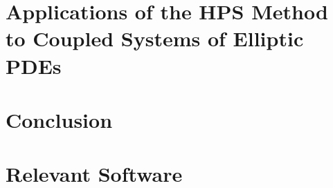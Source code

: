 \documentclass[12pt,twoside]{report}
\begin{document}
\chapter{Applications of the HPS Method to Coupled Systems of Elliptic PDEs}
\label{chap:applications}

\chapter{Conclusion}
\label{chap:conclusion}

{}


{}
\appendix
\chapter{Relevant Software}

% 
% 
% 
% 
\end{document}
